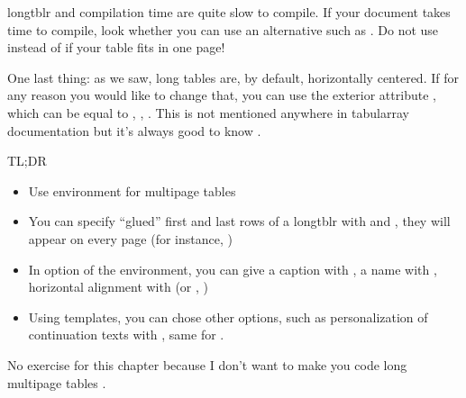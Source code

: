 \begin{warningbox}{longtblr and compilation time}
	 are quite slow to compile. If your document takes time to compile, look whether you can use an alternative such as . Do not use  instead of  if your table fits in one page!
\end{warningbox}

One last thing: as we saw, long tables are, by default, horizontally centered. If for any reason you would like to change that, you can use the exterior attribute , which can be equal to , , . This is not mentioned anywhere in tabularray documentation but it's always good to know .


\begin{infobox}{TL;DR}
	\begin{itemize}
		\item Use  environment for multipage tables
		\item You can specify ``glued'' first and last rows of a longtblr with  and , they will appear on every page (for instance, )
		\item In option of the  environment, you can give a caption with , a name with , horizontal alignment with  (or , )
		\item Using templates, you can chose other options, such as personalization of continuation texts with , same for .
	\end{itemize}

No exercise for this chapter because I don't want to make you code long multipage tables .
\end{infobox}